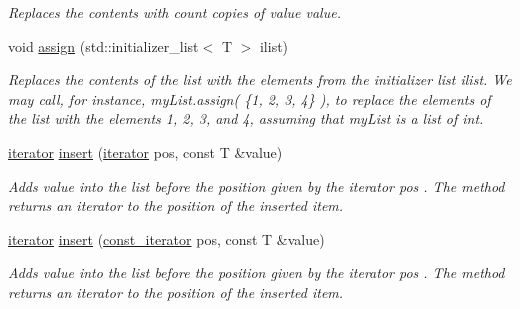 \begin{DoxyCompactItemize}
\begin{DoxyCompactList}\small\item\em Replaces the contents with count copies of value value. \end{DoxyCompactList}\item 
\mbox{\label{classls_1_1list_a3a502e5df12f088f6fda2edb5f79cfef}} 
void \hyperlink{classls_1_1list_a3a502e5df12f088f6fda2edb5f79cfef}{assign} (std\+::initializer\+\_\+list$<$ T $>$ ilist)
\begin{DoxyCompactList}\small\item\em Replaces the contents of the list with the elements from the initializer list ilist. We may call, for instance, my\+List.\+assign( \{1, 2, 3, 4\} ), to replace the elements of the list with the elements 1, 2, 3, and 4, assuming that my\+List is a list of int. \end{DoxyCompactList}\item 
\mbox{\label{classls_1_1list_afd87152a830dce5c7583239f9d25e044}} 
\hyperlink{classls_1_1list_af036cf72da26107a5084c1e4b45b9cb7}{iterator} \hyperlink{classls_1_1list_afd87152a830dce5c7583239f9d25e044}{insert} (\hyperlink{classls_1_1list_af036cf72da26107a5084c1e4b45b9cb7}{iterator} pos, const T \&value)
\begin{DoxyCompactList}\small\item\em Adds value into the list before the position given by the iterator pos . The method returns an iterator to the position of the inserted item. \end{DoxyCompactList}\item 
\mbox{\label{classls_1_1list_ac91d98c3a9b50bce8df0b6cda06e7e4f}} 
\hyperlink{classls_1_1list_af036cf72da26107a5084c1e4b45b9cb7}{iterator} \hyperlink{classls_1_1list_ac91d98c3a9b50bce8df0b6cda06e7e4f}{insert} (\hyperlink{classls_1_1list_ad543276e86075caadf97ae64f2fc7cfc}{const\+\_\+iterator} pos, const T \&value)
\begin{DoxyCompactList}\small\item\em Adds value into the list before the position given by the iterator pos . The method returns an iterator to the position of the inserted item. \end{DoxyCompactList}\item 
\mbox{\label{classls_1_1list_a145b47adc8f9ab447baad3c3fa2ccd60}} 

\end{DoxyCompactItemize}
